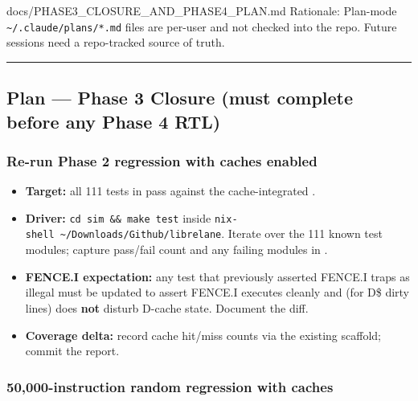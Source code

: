 \begin{relocated}{docs/PHASE3_CLOSURE_AND_PHASE4_PLAN.md}
Rationale: Plan-mode
\texttt{\textasciitilde{}/\allowbreak{}.\allowbreak{}claude/\allowbreak{}plans/\allowbreak{}*.\allowbreak{}md}
files are per-user and not checked into the repo. Future sessions need a
repo-tracked source of truth.

\begin{center}\rule{0.5\linewidth}{0.5pt}\end{center}

\subsection{Plan --- Phase 3 Closure (must complete before any Phase
4 RTL)}\label{ds:ch:phase3-closure-phase4-plan:4-plan-phase-3-closure-must-complete-before-any-phase-4-rtl}

\subsubsection{Re-run Phase 2 regression with caches enabled}\label{ds:ch:phase3-closure-phase4-plan:41-re-run-phase-2-regression-with-caches-enabled}

\begin{itemize}
\tightlist
\item
  \textbf{Target:} all 111 tests in  pass against
  the cache-integrated .
\item
  \textbf{Driver:} \texttt{cd\ sim\ \&\&\ make\ test} inside
  \texttt{nix-\allowbreak{}shell\ \textasciitilde{}/\allowbreak{}Downloads/\allowbreak{}Github/\allowbreak{}librelane}.
  Iterate over the 111 known test modules; capture pass/fail count and
  any failing modules in
  .
\item
  \textbf{FENCE.I expectation:} any test that previously asserted
  FENCE.I traps as illegal must be updated to assert FENCE.I executes
  cleanly and (for D\$ dirty lines) does \textbf{not} disturb D-cache
  state. Document the diff.
\item
  \textbf{Coverage delta:} record cache hit/miss counts via the existing
   scaffold; commit the report.
\end{itemize}

\subsubsection{50,000-instruction random regression with caches}\label{ds:ch:phase3-closure-phase4-plan:42-50000-instruction-random-regression-with-caches}


\end{relocated}
